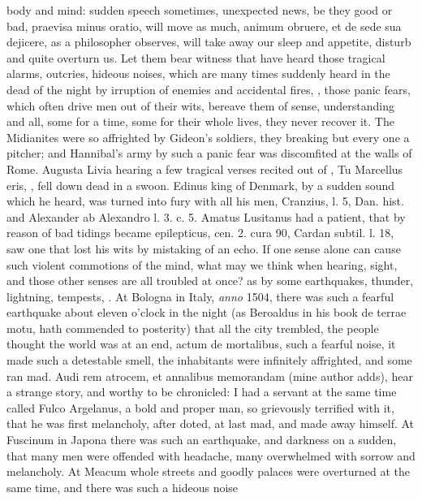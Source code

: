 {{body and mind: sudden speech sometimes, unexpected news, be they good
or bad, praevisa minus oratio, will move as much, animum obruere, et de
sede sua dejicere, as a philosopher observes, will take away our
sleep and appetite, disturb and quite overturn us. Let them bear
witness that have heard those tragical alarms, outcries, hideous
noises, which are many times suddenly heard in the dead of the night by
irruption of enemies and accidental fires, \etc{}, those panic
fears, which often drive men out of their wits, bereave them of sense,
understanding and all, some for a time, some for their whole lives,
they never recover it. The  Midianites were so affrighted by
Gideon's soldiers, they breaking but every one a pitcher; and
Hannibal's army by such a panic fear was discomfited at the walls
of Rome. Augusta Livia hearing a few tragical verses recited out of
\Virgil{}, Tu Marcellus eris, \etc{}, fell down dead in a swoon. Edinus king
of Denmark, by a sudden sound which he heard,  was turned into
fury with all his men, Cranzius, l. 5, Dan. hist. and Alexander ab
Alexandro l. 3. c. 5. Amatus Lusitanus had a patient, that by reason of
bad tidings became epilepticus, cen. 2. cura 90, Cardan subtil. l. 18,
saw one that lost his wits by mistaking of an echo. If one sense alone
can cause such violent commotions of the mind, what may we think when
hearing, sight, and those other senses are all troubled at once? as by
some earthquakes, thunder, lightning, tempests, \etc{}. At Bologna in
Italy, \emph{anno} 1504, there was such a fearful earthquake about eleven
o'clock in the night (as Beroaldus in his book de terrae motu,
hath commended to posterity) that all the city trembled, the people
thought the world was at an end, actum de mortalibus, such a fearful
noise, it made such a detestable smell, the inhabitants were infinitely
affrighted, and some ran mad. Audi rem atrocem, et annalibus memorandam
(mine author adds), hear a strange story, and worthy to be chronicled:
I had a servant at the same time called Fulco Argelanus, a bold and
proper man, so grievously terrified with it, that he was first
melancholy, after doted, at last mad, and made away himself. At
Fuscinum in Japona there was such an earthquake, and darkness on
a sudden, that many men were offended with headache, many overwhelmed
with sorrow and melancholy. At Meacum whole streets and goodly palaces
were overturned at the same time, and there was such a hideous noise
}}

